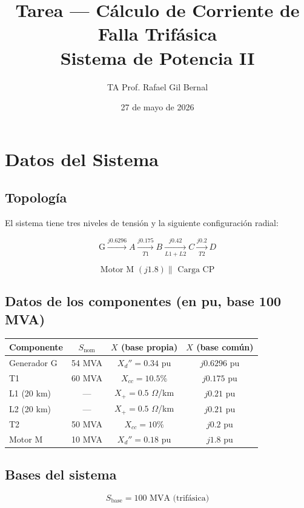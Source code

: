 \documentclass[12pt,a4paper]{article}
\title{Tarea --- Cálculo de Corriente de Falla Trifásica\\Sistema de Potencia II}
\author{TA Prof. Rafael Gil Bernal}
\date{27 de mayo de 2026}
\begin{document}
\maketitle

\section{Datos del Sistema}

\subsection{Topología}

El sistema tiene tres niveles de tensión y la siguiente configuración radial:

\[
\text{G} \xrightarrow[]{j0.6296} \boxed{A} \xrightarrow[T1]{j0.175} \boxed{B} \xrightarrow[L1+L2]{j0.42} \boxed{C} \xrightarrow[T2]{j0.2} \boxed{D}
\]

\[
\text{ Motor M }(j1.8) \parallel \text{ Carga CP }
\]

\subsection{Datos de los componentes (en pu, base 100 MVA)}

\begin{center}
\begin{tabular}{lccc}
\toprule
Componente & $S_{\text{nom}}$ & $X$ (base propia) & $X$ (base común) \\
\midrule
Generador G & 54 MVA & $X_d'' = 0.34$ pu & $j0.6296$ pu \\
T1 & 60 MVA & $X_{cc} = 10.5\%$ & $j0.175$ pu \\
L1 (20 km) & --- & $X_+ = 0.5$ $\Omega$/km & $j0.21$ pu \\
L2 (20 km) & --- & $X_+ = 0.5$ $\Omega$/km & $j0.21$ pu \\
T2 & 50 MVA & $X_{cc} = 10\%$ & $j0.2$ pu \\
Motor M & 10 MVA & $X_d'' = 0.18$ pu & $j1.8$ pu \\
\bottomrule
\end{tabular}
\end{center}

\subsection{Bases del sistema}

\[
S_{\text{base}} = 100\text{ MVA (trifásica)}
\]
\end{document}
